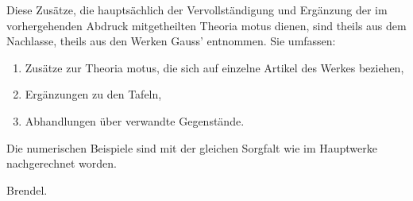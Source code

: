\documentclass[11pt,a4paper]{article}
\begin{document}
\vspace{2cm}

\noindent Diese Zusätze, die hauptsächlich der Vervollständigung und Ergänzung der im vorhergehenden Abdruck mitgetheilten Theoria motus dienen, sind theils aus dem Nachlasse, theils aus den Werken Gauss' entnommen. Sie umfassen:

\begin{enumerate}[label=\arabic*.]
\item Zusätze zur Theoria motus, die sich auf einzelne Artikel des Werkes beziehen,
\item Ergänzungen zu den Tafeln,
\item Abhandlungen über verwandte Gegenstände.
\end{enumerate}

\vspace{1em}

\noindent Die numerischen Beispiele sind mit der gleichen Sorgfalt wie im Hauptwerke nachgerechnet worden.

\vfill

\begin{flushright}
Brendel.
\end{flushright}
\end{document}
